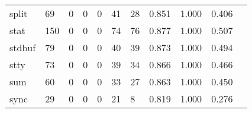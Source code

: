 \begin{longtable}{lp{1.2cm}p{1.2cm}p{1.2cm}p{1.2cm}p{1.2cm}p{1.2cm}p{1.2cm}p{1.2cm}p{1.2cm}p{1.2cm}}
split     &                                    69 &                                                  0 &                                                  0 &                                                  0 &                                                 41 &                                                 28 &                                              0.851 &                                              1.000 &                                              0.406 \\
stat      &                                   150 &                                                  0 &                                                  0 &                                                  0 &                                                 74 &                                                 76 &                                              0.877 &                                              1.000 &                                              0.507 \\
stdbuf    &                                    79 &                                                  0 &                                                  0 &                                                  0 &                                                 40 &                                                 39 &                                              0.873 &                                              1.000 &                                              0.494 \\
stty      &                                    73 &                                                  0 &                                                  0 &                                                  0 &                                                 39 &                                                 34 &                                              0.866 &                                              1.000 &                                              0.466 \\
sum       &                                    60 &                                                  0 &                                                  0 &                                                  0 &                                                 33 &                                                 27 &                                              0.863 &                                              1.000 &                                              0.450 \\
sync      &                                    29 &                                                  0 &                                                  0 &                                                  0 &                                                 21 &                                                  8 &                                              0.819 &                                              1.000 &                                              0.276 \\

\end{longtable}
